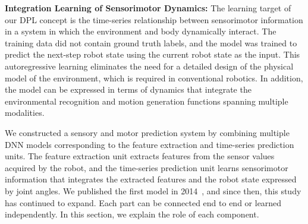 \textbf{Integration Learning of Sensorimotor Dynamics:}
The learning target of our DPL concept is the time-series relationship between sensorimotor information in a system in which the environment and body dynamically interact. The training data did not contain ground truth labels, and the model was trained to predict the next-step robot state using the current robot state as the input. This autoregressive learning eliminates the need for a detailed design of the physical model of the environment, which is required in conventional robotics. In addition, the model can be expressed in terms of dynamics that integrate the environmental recognition and motion generation functions spanning multiple modalities.


We constructed a sensory and motor prediction system by combining multiple DNN models corresponding to the feature extraction and time-series prediction units. The feature extraction unit extracts features from the sensor values acquired by the robot, and the time-series prediction unit learns sensorimotor information that integrates the extracted features and the robot state expressed by joint angles. We published the first model in 2014~\cite{Noda2014multimodal}, and since then, this study has continued to expand. Each part can be connected end to end or learned independently. In this section, we explain the role of each component.


